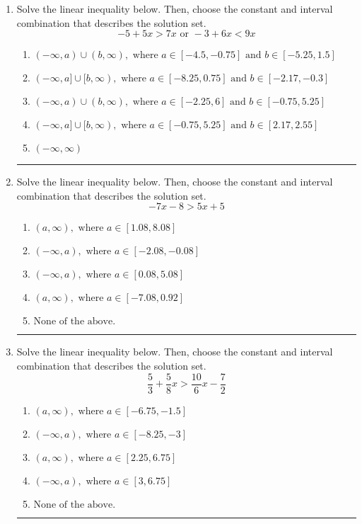 \documentclass[14pt]{extbook}
\newcommand{\litem}[1]{\item#1\hspace*{-1cm}\rule{\textwidth}{0.4pt}}
\begin{document}
\begin{enumerate}
{\begin{enumerate}[label=\Alph*.]
\end{enumerate} }
\litem{
Solve the linear inequality below. Then, choose the constant and interval combination that describes the solution set.\[ -5 + 5 x > 7 x \text{ or } -3 + 6 x < 9 x \]\begin{enumerate}[label=\Alph*.]
\item \( (-\infty, a) \cup (b, \infty), \text{ where } a \in [-4.5, -0.75] \text{ and } b \in [-5.25, 1.5] \)
\item \( (-\infty, a] \cup [b, \infty), \text{ where } a \in [-8.25, 0.75] \text{ and } b \in [-2.17, -0.3] \)
\item \( (-\infty, a) \cup (b, \infty), \text{ where } a \in [-2.25, 6] \text{ and } b \in [-0.75, 5.25] \)
\item \( (-\infty, a] \cup [b, \infty), \text{ where } a \in [-0.75, 5.25] \text{ and } b \in [2.17, 2.55] \)
\item \( (-\infty, \infty) \)

\end{enumerate} }
\litem{
Solve the linear inequality below. Then, choose the constant and interval combination that describes the solution set.\[ -7x -8 > 5x + 5 \]\begin{enumerate}[label=\Alph*.]
\item \( (a, \infty), \text{ where } a \in [1.08, 8.08] \)
\item \( (-\infty, a), \text{ where } a \in [-2.08, -0.08] \)
\item \( (-\infty, a), \text{ where } a \in [0.08, 5.08] \)
\item \( (a, \infty), \text{ where } a \in [-7.08, 0.92] \)
\item \( \text{None of the above}. \)

\end{enumerate} }
\litem{
Solve the linear inequality below. Then, choose the constant and interval combination that describes the solution set.\[ \frac{5}{3} + \frac{5}{8} x > \frac{10}{6} x - \frac{7}{2} \]\begin{enumerate}[label=\Alph*.]
\item \( (a, \infty), \text{ where } a \in [-6.75, -1.5] \)
\item \( (-\infty, a), \text{ where } a \in [-8.25, -3] \)
\item \( (a, \infty), \text{ where } a \in [2.25, 6.75] \)
\item \( (-\infty, a), \text{ where } a \in [3, 6.75] \)
\item \( \text{None of the above}. \)


\end{enumerate}}
\end{enumerate}
\end{document}
